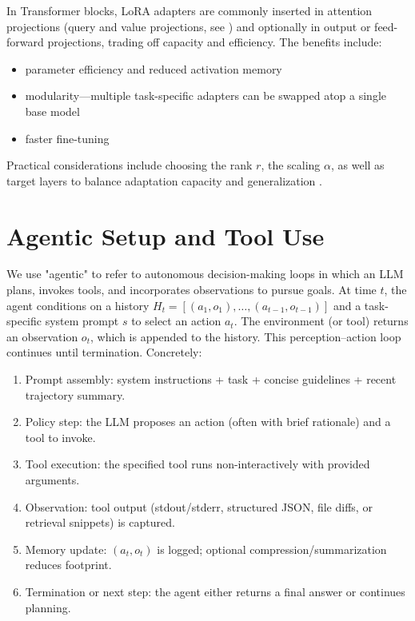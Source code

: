 In Transformer blocks, LoRA adapters are commonly inserted in attention projections (query and value projections, see \cite{hu2021lora}) and optionally in output or feed-forward projections, trading off capacity and efficiency. 
The benefits include: 
\begin{itemize}
    \item parameter efficiency and reduced activation memory
    \item modularity—multiple task-specific adapters can be swapped atop a single base model
    \item faster fine-tuning
\end{itemize}
Practical considerations include choosing the rank \(r\), the scaling \(\alpha\), as well as target layers to balance adaptation capacity and generalization \cite{hu2021lora}.


\section{Agentic Setup and Tool Use}

We use "agentic" to refer to autonomous decision-making loops in which an LLM plans, invokes tools, and incorporates observations to pursue goals. 
At time \(t\), the agent conditions on a history \(H_t = [(a_1,o_1),\dots,(a_{t-1},o_{t-1})]\) and a task-specific system prompt \(s\) to select an action \(a_t\). 
The environment (or tool) returns an observation \(o_t\), which is appended to the history. This perception–action loop continues until termination. Concretely:
\begin{enumerate}
  \item Prompt assembly: system instructions + task + concise guidelines + recent trajectory summary.
  \item Policy step: the LLM proposes an action (often with brief rationale) and a tool to invoke.
  \item Tool execution: the specified tool runs non-interactively with provided arguments.
  \item Observation: tool output (stdout/stderr, structured JSON, file diffs, or retrieval snippets) is captured.
  \item Memory update: \((a_t, o_t)\) is logged; optional compression/summarization reduces footprint.
  \item Termination or next step: the agent either returns a final answer or continues planning.
\end{enumerate}



